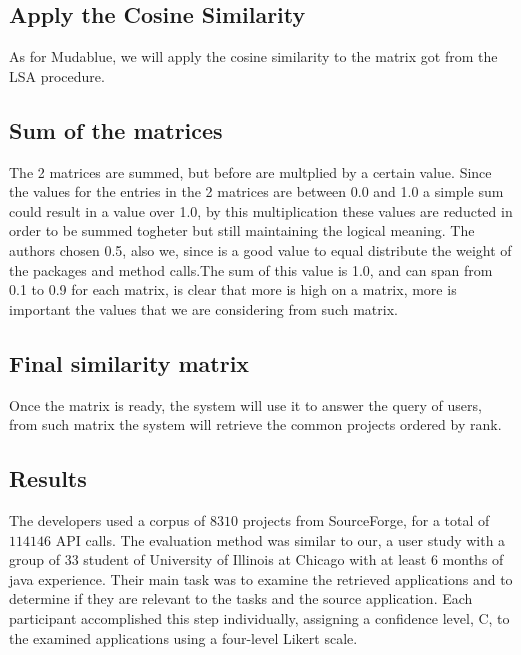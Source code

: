\subsection{Apply the Cosine Similarity}
As for Mudablue, we will apply the cosine similarity to the matrix got from the LSA procedure.

\subsection{Sum of the matrices}
The 2 matrices are summed, but before are multplied by a certain value. Since the values for the entries in the 2 matrices are between 0.0 and 1.0 a simple sum could result in a value over 1.0, by this multiplication these values are reducted in order to be summed togheter but still maintaining the logical meaning. The authors chosen 0.5, also we, since is a good value to equal distribute the weight of the packages and method calls.The sum of this value is 1.0, and can span from 0.1 to 0.9 for each matrix, is clear that more is high on a matrix, more is important the values that we are considering from such matrix.

\subsection{Final similarity matrix}
Once the matrix is ready, the system will use it to answer the query of users, from such  matrix the system will retrieve the common projects ordered by rank.

\subsection{Results}
The developers used a corpus of $8310$ projects from SourceForge, for a total of $114146$ API calls. The evaluation method was similar to our, a user study with a group of 33 student of University of Illinois at Chicago with at least 6 months of java experience. Their main task was to examine the retrieved applications and to determine if they are relevant to the tasks and the source application. Each participant accomplished this step individually, assigning a confidence level, C, to the examined applications using a four-level Likert scale.


%


